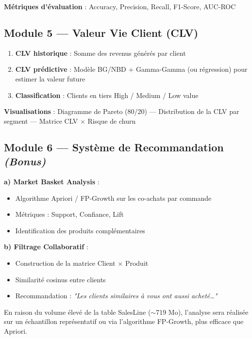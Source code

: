 \documentclass[11pt,a4paper]{article}
\begin{document}
\textbf{Métriques d'évaluation} : Accuracy, Precision, Recall, F1-Score, AUC-ROC

\subsection{Module 5 --- Valeur Vie Client (CLV)}

\begin{enumerate}[noitemsep, leftmargin=1.5em]
  \item \textbf{CLV historique} : Somme des revenus générés par client
  \item \textbf{CLV prédictive} : Modèle BG/NBD + Gamma-Gamma (ou régression) pour estimer la valeur future
  \item \textbf{Classification} : Clients en tiers High / Medium / Low value
\end{enumerate}

\textbf{Visualisations} : Diagramme de Pareto (80/20) --- Distribution de la CLV par segment --- Matrice CLV $\times$ Risque de churn

\subsection{Module 6 --- Système de Recommandation \textit{(Bonus)}}

\textbf{a) Market Basket Analysis} :
\begin{itemize}[noitemsep, leftmargin=1.5em]
  \item Algorithme Apriori / FP-Growth sur les co-achats par commande
  \item Métriques : Support, Confiance, Lift
  \item Identification des produits complémentaires
\end{itemize}

\textbf{b) Filtrage Collaboratif} :
\begin{itemize}[noitemsep, leftmargin=1.5em]
  \item Construction de la matrice Client $\times$ Produit
  \item Similarité cosinus entre clients
  \item Recommandation : \textit{"Les clients similaires à vous ont aussi acheté\ldots"}
\end{itemize}

\begin{infobox}
En raison du volume élevé de la table SalesLine ($\sim$719 Mo), l'analyse sera réalisée sur un échantillon représentatif ou via l'algorithme FP-Growth, plus efficace que Apriori.
\end{infobox}
\end{document}
